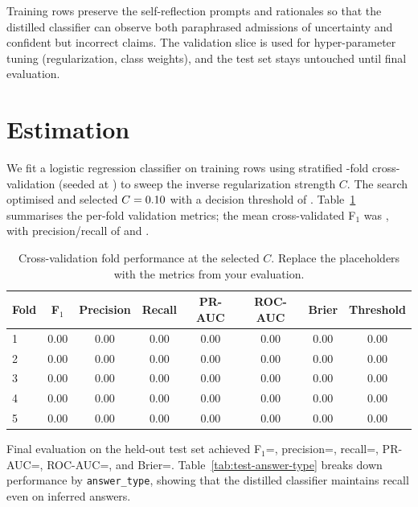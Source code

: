 \documentclass[11pt]{article}
\begin{document}
Training rows preserve the self-reflection prompts and rationales so that the distilled classifier can observe both paraphrased admissions of uncertainty and confident but incorrect claims. The validation slice is used for hyper-parameter tuning (regularization, class weights), and the test set stays untouched until final evaluation.

\section{Estimation}
We fit a logistic regression classifier on \EstTrainSize training rows using stratified \EstCvNSplits-fold cross-validation (seeded at \EstCvSeed) to sweep the inverse regularization strength \(C\). The search optimised \texttt{\EstCvObjective} and selected \(C = 0.10\) with a decision threshold of \EstFinalThreshold{}. Table~\ref{tab:cv-folds} summarises the per-fold validation metrics; the mean cross-validated F$_1$ was \EstCvFOne{}, with precision/recall of \EstCvPrecision{} and \EstCvRecall{}.

\begin{table}[ht]
  \centering
  \renewcommand{\arraystretch}{1.15}
  \begin{tabular}{@{}lccccccc@{}}
    \toprule
    \textbf{Fold} & \textbf{F$_1$} & \textbf{Precision} & \textbf{Recall} & \textbf{PR-AUC} & \textbf{ROC-AUC} & \textbf{Brier} & \textbf{Threshold} \\
    \midrule
    1 & 0.00 & 0.00 & 0.00 & 0.00 & 0.00 & 0.00 & 0.00 \\
    2 & 0.00 & 0.00 & 0.00 & 0.00 & 0.00 & 0.00 & 0.00 \\
    3 & 0.00 & 0.00 & 0.00 & 0.00 & 0.00 & 0.00 & 0.00 \\
    4 & 0.00 & 0.00 & 0.00 & 0.00 & 0.00 & 0.00 & 0.00 \\
    5 & 0.00 & 0.00 & 0.00 & 0.00 & 0.00 & 0.00 & 0.00 \\
    \bottomrule
  \end{tabular}
  \caption{Cross-validation fold performance at the selected \(C\). Replace the placeholders with the metrics from your evaluation.}
  \label{tab:cv-folds}
\end{table}

Final evaluation on the held-out test set achieved F$_1$=\EstTestFOne{}, precision=\EstTestPrecision{}, recall=\EstTestRecall{}, PR-AUC=\EstTestPrauc{}, ROC-AUC=\EstTestRocauc{}, and Brier=\EstTestBrier{}. Table~\ref{tab:test-answer-type} breaks down performance by \texttt{answer\_type}, showing that the distilled classifier maintains recall even on inferred answers.
\end{document}
